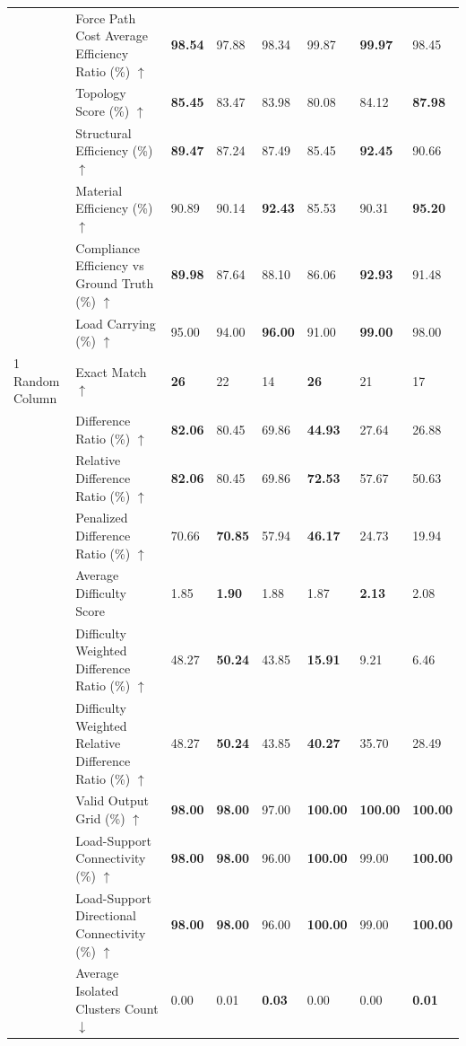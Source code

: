 \begin{table}[!h]
{\begin{tabular}{lllll|lll}
 & Force Path Cost Average Efficiency Ratio (\%) $\uparrow$ & \textbf{98.54} & 97.88 & 98.34 & 99.87 & \textbf{99.97} & 98.45 \\
 & Topology Score (\%) $\uparrow$ & \textbf{85.45} & 83.47 & 83.98 & 80.08 & 84.12 & \textbf{87.98} \\
 & Structural Efficiency (\%) $\uparrow$ & \textbf{89.47} & 87.24 & 87.49 & 85.45 & \textbf{92.45} & 90.66 \\
 & Material Efficiency (\%) $\uparrow$ & 90.89 & 90.14 & \textbf{92.43} & 85.53 & 90.31 & \textbf{95.20} \\
 & Compliance Efficiency vs Ground Truth (\%) $\uparrow$ & \textbf{89.98} & 87.64 & 88.10 & 86.06 & \textbf{92.93} & 91.48 \\
 & Load Carrying (\%) $\uparrow$ & 95.00 & 94.00 & \textbf{96.00} & 91.00 & \textbf{99.00} & 98.00 \\
\midrule
1 Random Column & Exact Match $\uparrow$ & \textbf{26} & 22 & 14 & \textbf{26} & 21 & 17 \\
 & Difference Ratio (\%) $\uparrow$ & \textbf{82.06} & 80.45 & 69.86 & \textbf{44.93} & 27.64 & 26.88 \\
 & Relative Difference Ratio (\%) $\uparrow$ & \textbf{82.06} & 80.45 & 69.86 & \textbf{72.53} & 57.67 & 50.63 \\
 & Penalized Difference Ratio (\%) $\uparrow$ & 70.66 & \textbf{70.85} & 57.94 & \textbf{46.17} & 24.73 & 19.94 \\
 & Average Difficulty Score & 1.85 & \textbf{1.90} & 1.88 & 1.87 & \textbf{2.13} & 2.08 \\
 & Difficulty Weighted Difference Ratio (\%) $\uparrow$ & 48.27 & \textbf{50.24} & 43.85 & \textbf{15.91} & 9.21 & 6.46 \\
 & Difficulty Weighted Relative Difference Ratio (\%) $\uparrow$ & 48.27 & \textbf{50.24} & 43.85 & \textbf{40.27} & 35.70 & 28.49 \\
 & Valid Output Grid (\%) $\uparrow$ & \textbf{98.00} & \textbf{98.00} & 97.00 & \textbf{100.00} & \textbf{100.00} & \textbf{100.00} \\
 & Load-Support Connectivity (\%) $\uparrow$ & \textbf{98.00} & \textbf{98.00} & 96.00 & \textbf{100.00} & 99.00 & \textbf{100.00} \\
 & Load-Support Directional Connectivity (\%) $\uparrow$ & \textbf{98.00} & \textbf{98.00} & 96.00 & \textbf{100.00} & 99.00 & \textbf{100.00} \\
 & Average Isolated Clusters Count $\downarrow$ & 0.00 & 0.01 & \textbf{0.03} & 0.00 & 0.00 & \textbf{0.01} \\

\end{tabular}}
\end{table}

